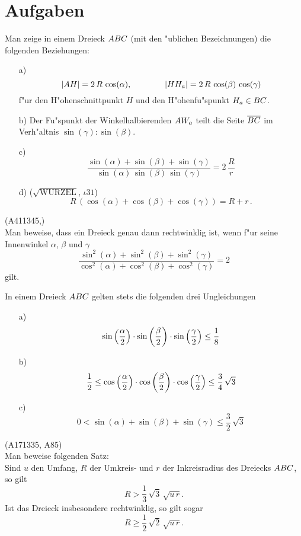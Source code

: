 \documentclass[11pt,a4paper]{article}
\begin{document}
\section{Aufgaben}
\begin{aufgabe}
 Man zeige in einem Dreieck $\ktriangle*{ABC}$ (mit den "ublichen
 Bezeichnungen) die folgenden Beziehungen:
 \begin{enumerate}
 \item[a)] 
\[\left\vert {\mathnormal{AH}}\right\vert =2\,R\,\cos(\alpha),\qquad\qquad\left\vert {\mathnormal{HH_a}}\right\vert
=2\,R\,\cos(\beta)\,\cos(\gamma)\]
   f"ur den H"ohenschnittpunkt $H$ und den H"ohenfu"spunkt $H_a\in{\mathnormal{BC}}$.
 \item[b)] Der Fu"spunkt der Winkelhalbierenden ${\mathnormal{AW_a}}$ teilt die Seite
   $\overline{{\mathnormal{BC}}}$ im Verh"altnis $\sin(\gamma):\sin(\beta)$.
 \item[c)] 
\[ \frac{\sin(\alpha)+\sin(\beta)+\sin(\gamma)}
  {\sin(\alpha)\,\sin(\beta)\,\sin(\gamma)}=2\,\frac{R}{r} \] 
 \item[d)] ($\sqrt{\mbox{WURZEL}}$, $\iota31$)
   \[ R\,(\cos(\alpha)+\cos(\beta)+\cos(\gamma))=R+r\,. \]
 \end{enumerate}
\end{aufgabe}
\begin{aufgabe} (A411345,\cite{MO})\\
  Man beweise, dass ein Dreieck genau dann rechtwinklig ist, wenn f"ur seine
  Innenwinkel $\alpha$, $\beta$ und $\gamma$
  \[ \frac{\sin^2(\alpha)+\sin^2(\beta)+\sin^2(\gamma)}
     {\cos^2(\alpha)+\cos^2(\beta)+\cos^2(\gamma)}=2
  \]
  gilt.
\end{aufgabe}
\begin{aufgabe}
  In einem Dreieck $\ktriangle*{ABC}$ gelten stets die folgenden drei
  Ungleichungen
  \begin{enumerate}
  \item[a)] 
\[\sin\left(\frac\alpha2\right)\cdot \sin\left(\frac\beta2\right)\cdot \sin\left(\frac\gamma2\right)
\leq\frac18\] 
  \item[b)] 
\[\frac12 \leq\cos\left(\frac\alpha2\right)\cdot \cos\left(\frac\beta2\right)\cdot
\cos\left(\frac\gamma2\right) \leq\frac34\,\sqrt3\]
  \item[c)] 
\[0<\sin(\alpha)+\sin(\beta)+\sin(\gamma)\leq\frac32\,\sqrt{3}\]
  \end{enumerate}
\end{aufgabe}
\begin{aufgabe} (A171335, \cite{Lesebogen} A85)\\
  Man beweise folgenden Satz:\\
  Sind $u$ den Umfang, $R$ der Umkreis- und $r$ der Inkreisradius des Dreiecks
  $\ktriangle*{ABC}$, so gilt
  \[ R>\frac13\,\sqrt{3}\,\sqrt{u\,r}.\]
  Ist das Dreieck insbesondere rechtwinklig, so gilt sogar
  \[ R\geq\frac12\,\sqrt2\,\sqrt{u\,r}. \]
\end{aufgabe}
\end{document}
